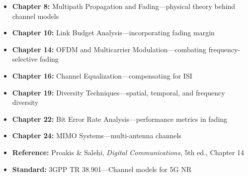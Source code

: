 \begin{itemize}
\item \textbf{Chapter 8:} Multipath Propagation and Fading---physical theory behind channel models
\item \textbf{Chapter 10:} Link Budget Analysis---incorporating fading margin
\item \textbf{Chapter 14:} OFDM and Multicarrier Modulation---combating frequency-selective fading
\item \textbf{Chapter 16:} Channel Equalization---compensating for ISI
\item \textbf{Chapter 19:} Diversity Techniques---spatial, temporal, and frequency diversity
\item \textbf{Chapter 22:} Bit Error Rate Analysis---performance metrics in fading
\item \textbf{Chapter 24:} MIMO Systems---multi-antenna channels
\item \textbf{Reference:} Proakis \& Salehi, \textit{Digital Communications}, 5th ed., Chapter 14
\item \textbf{Standard:} 3GPP TR 38.901---Channel models for 5G NR
\end{itemize}
